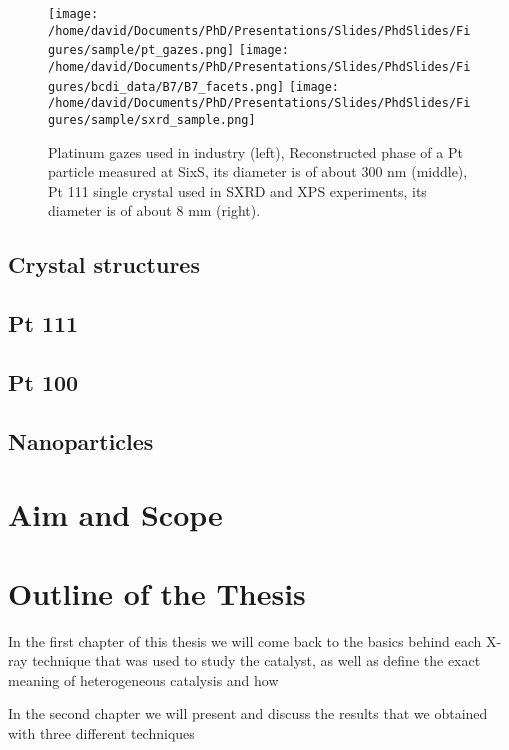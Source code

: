 \begin{figure}[!htb]
    \centering
    \texttt{[image: /home/david/Documents/PhD/Presentations/Slides/PhdSlides/Figures/sample/pt\_gazes.png]}
    \texttt{[image: /home/david/Documents/PhD/Presentations/Slides/PhdSlides/Figures/bcdi\_data/B7/B7\_facets.png]}
    \texttt{[image: /home/david/Documents/PhD/Presentations/Slides/PhdSlides/Figures/sample/sxrd\_sample.png]}
    \caption{Platinum gazes used in industry (left), {\color{DarkOrange}Reconstructed phase of a} Pt particle measured at SixS, {\color{DarkOrange}its diameter is} of about 300 nm (middle), Pt 111 single crystal used in SXRD and XPS experiments, {\color{DarkOrange}its diameter} is of about 8 mm (right).}
\end{figure}

\subsection{Crystal structures}

\subsection{Pt 111}

\subsection{Pt 100}

\subsection{Nanoparticles}

\section{Aim and Scope}

\section{Outline of the Thesis}

In the first chapter of this thesis we will come back to the basics behind each X-ray technique that was used to study the catalyst, as well as define the exact meaning of heterogeneous catalysis and how

In the second chapter we will present and discuss the results that we obtained with three different techniques
